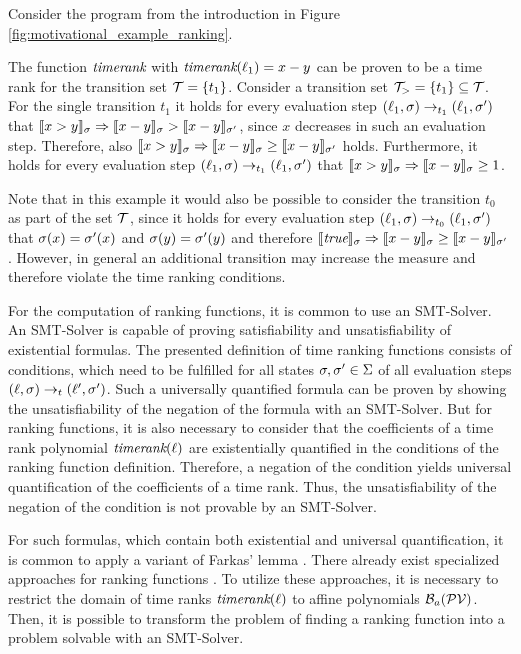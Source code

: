 \begin{example}
  Consider the program from the introduction in Figure \ref{fig:motivational_example_ranking}.
  
  The function $\emph{timerank}$ with $\emph{timerank}(\ell_1) = x-y$ can be proven to be a time rank for the transition set $\mathcal{T} = \lbrace t_1 \rbrace$.
  Consider a transition set $\mathcal{T}_> = \lbrace t_1 \rbrace \subseteq \mathcal{T}$.
  For the single transition $t_1$ it holds for every evaluation step $(\ell_1,\sigma) \rightarrow_{t_1} (\ell_1,\sigma')$ that $\llbracket x>y \rrbracket_{\sigma} \Rightarrow \llbracket x-y \rrbracket_{\sigma} > \llbracket x-y \rrbracket_{\sigma'}$, since $x$ decreases in such an evaluation step.
  Therefore, also $\llbracket x>y \rrbracket_{\sigma} \Rightarrow \llbracket x-y \rrbracket_{\sigma} \geq \llbracket x-y \rrbracket_{\sigma'}$ holds.
  Furthermore, it holds for every evaluation step $(\ell_1,\sigma) \rightarrow_{t_1} (\ell_1,\sigma')$ that $\llbracket x>y \rrbracket_{\sigma} \Rightarrow \llbracket x-y \rrbracket_{\sigma} \geq 1$.

  Note that in this example it would also be possible to consider the transition $t_0$ as part of the set $\mathcal{T}$, since it holds for every evaluation step $(\ell_1,\sigma) \rightarrow_{t_0} (\ell_1,\sigma')$ that $\sigma(x)=\sigma'(x)$ and $\sigma(y)=\sigma'(y)$ and therefore $\llbracket \emph{true} \rrbracket_{\sigma} \Rightarrow \llbracket x-y \rrbracket_{\sigma} \geq \llbracket x-y \rrbracket_{\sigma'}$.
  However, in general an additional transition may increase the measure and therefore violate the time ranking conditions.
\end{example}

For the computation of ranking functions, it is common to use an SMT-Solver.
An SMT-Solver is capable of proving satisfiability and unsatisfiability of existential formulas.
The presented definition of time ranking functions consists of conditions, which need to be fulfilled for all states $\sigma, \sigma' \in \Sigma$ of all evaluation steps $(\ell, \sigma) \rightarrow_t (\ell', \sigma')$.
Such a universally quantified formula can be proven by showing the unsatisfiability of the negation of the formula with an SMT-Solver.
But for ranking functions, it is also necessary to consider that the coefficients of a time rank polynomial $\emph{timerank}(\ell)$ are existentially quantified in the conditions of the ranking function definition.
Therefore, a negation of the condition yields universal quantification of the coefficients of a time rank.
Thus, the unsatisfiability of the negation of the condition is not provable by an SMT-Solver.

For such formulas, which contain both existential and universal quantification, it is common to apply a variant of Farkas' lemma \cite{schrijver1998theory}.
There already exist specialized approaches for ranking functions \cite{bradley2005polyranking}.
To utilize these approaches, it is necessary to restrict the domain of time ranks $\emph{timerank}(\ell)$ to affine polynomials $\mathcal{B}_a(\mathcal{PV})$.
Then, it is possible to transform the problem of finding a ranking function into a problem solvable with an SMT-Solver.

